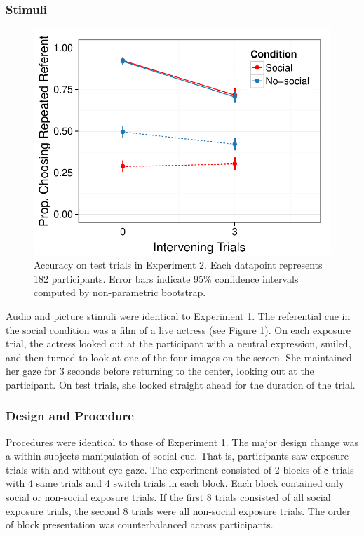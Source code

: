 \documentclass[10pt,letterpaper]{article}
\begin{document}
\subsubsection{Stimuli}

\begin{figure}[t!]
\begin{center}
\includegraphics[scale=0.45]{plots_figs/acc-test-expt2}
\end{center}
\caption{Accuracy on test trials in Experiment 2. Each datapoint represents 182 participants. Error bars indicate 95\% confidence intervals computed by non-parametric bootstrap.}
\end{figure}

Audio and picture stimuli were identical to Experiment 1. The referential cue in the social condition was a film of a live actress (see Figure 1). On each exposure trial, the actress looked out at the participant with a neutral expression, smiled, and then turned to look at one of the four images on the screen. She maintained her gaze for 3 seconds before returning to the center, looking out at the participant. On test trials, she looked straight ahead for the duration of the trial. 

\subsubsection{Design and Procedure}

Procedures were identical to those of Experiment 1. The major design change was a within-subjects manipulation of social cue. That is, participants saw exposure trials with and without eye gaze. The experiment consisted of 2 blocks of 8 trials with 4 same trials and 4 switch trials in each block. Each block contained only social or non-social exposure trials. If the first 8 trials consisted of all social exposure trials, the second 8 trials were all non-social exposure trials. The order of block presentation was counterbalanced across participants. 
\end{document}
